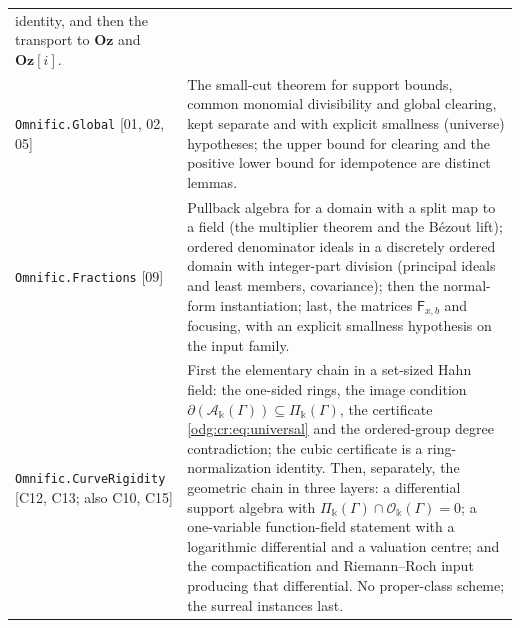 \documentclass[11pt,oneside]{article}
\numberwithin{equation}{section}
\theoremstyle{definition}
\theoremstyle{remark}
\newcommand{\Oz}{\mathbf{Oz}}
\newcommand{\src}[1]{\textup{\textsf{\small[#1]}}}
\newcommand{\fn}[1]{\nolinkurl{#1}}
\newcommand{\Og}{\Oz[i]}
\newcommand{\crA}{\mathcal A_\Bbbk(\Gamma)}
\newcommand{\crP}{\Pi_\Bbbk(\Gamma)}
\newcommand{\crO}{\mathcal O_\Bbbk(\Gamma)}
\begin{document}
\begin{longtable}{>{\raggedright\arraybackslash}p{}>{\raggedright\arraybackslash}p{}}
identity, and then the transport to $\Oz$ and $\Og$.\\
\fn{Omnific.Global} \src{01, 02, 05} & The small-cut theorem for support
bounds, common monomial divisibility and global clearing, kept separate and
with explicit smallness (universe) hypotheses; the upper bound for clearing
and the positive lower bound for idempotence are distinct lemmas.\\
\fn{Omnific.Fractions} \src{09} & Pullback algebra for a domain with a split
map to a field (the multiplier theorem and the B\'ezout lift); ordered
denominator ideals in a discretely ordered domain with integer-part division
(principal ideals and least members, covariance); then the normal-form
instantiation; last, the matrices $\mathsf F_{x,b}$ and focusing, with an
explicit smallness hypothesis on the input family.\\
\fn{Omnific.CurveRigidity} \src{C12, C13; also C10, C15} & First the elementary chain in a
set-sized Hahn field: the one-sided rings, the image condition
$\partial(\crA)\subseteq\crP$, the certificate \eqref{odg:cr:eq:universal} and the
ordered-group degree contradiction; the cubic certificate is a ring-normalization
identity. Then, separately, the geometric chain in three layers: a differential
support algebra with $\crP\cap\crO=0$; a one-variable function-field statement with a
logarithmic differential and a valuation centre; and the compactification and
Riemann--Roch input producing that differential. No proper-class scheme; the surreal
instances last.\\
\end{longtable}
\endgroup
\end{document}
